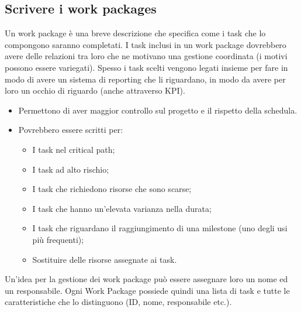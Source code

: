 \subsection{Scrivere i work packages}
Un work package è una breve descrizione che specifica come i task che lo compongono saranno completati. I task inclusi in un work package dovrebbero avere delle relazioni tra loro che ne motivano una gestione coordinata (i motivi possono essere variegati). Spesso i task scelti vengono legati insieme per fare in modo di avere un sistema di reporting che li riguardano, in modo da avere per loro un occhio di riguardo (anche attraverso KPI).
\begin{itemize}
	\item Permettono di aver maggior controllo sul progetto e il rispetto della schedula.
	\item Povrebbero essere scritti per:
	\begin{itemize}
		\item I task nel critical path;
		\item I task ad alto rischio;
		\item I task che richiedono risorse che sono scarse;
		\item I task che hanno un’elevata varianza nella durata;
		\item I task che riguardano il raggiungimento di una milestone (uno degli usi più frequenti);
		\item Sostituire delle risorse assegnate ai task.
	\end{itemize}
\end{itemize}
Un'idea per la gestione dei work package può essere assegnare loro un nome ed un responsabile.
\noindent Ogni Work Package possiede quindi una lista di task e tutte le caratteristiche che lo distinguono (ID, nome, responsabile etc.).
